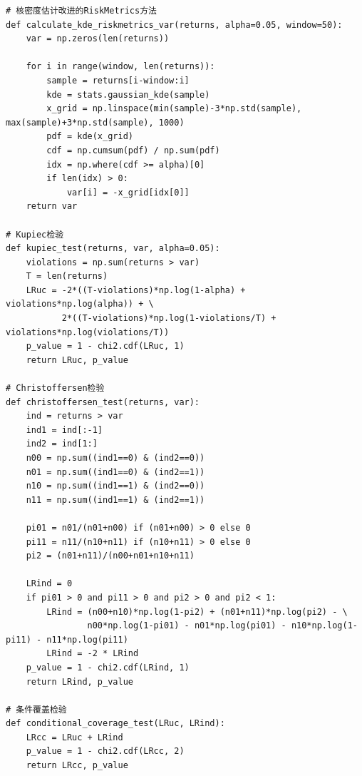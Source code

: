 \documentclass[12pt, a4paper]{article}
\begin{document}
\begin{lstlisting}[basicstyle=\small\ttfamily, breaklines=true, columns=fullflexible]
# 核密度估计改进的RiskMetrics方法
def calculate_kde_riskmetrics_var(returns, alpha=0.05, window=50):
    var = np.zeros(len(returns))
    
    for i in range(window, len(returns)):
        sample = returns[i-window:i]
        kde = stats.gaussian_kde(sample)
        x_grid = np.linspace(min(sample)-3*np.std(sample), max(sample)+3*np.std(sample), 1000)
        pdf = kde(x_grid)
        cdf = np.cumsum(pdf) / np.sum(pdf)
        idx = np.where(cdf >= alpha)[0]
        if len(idx) > 0:
            var[i] = -x_grid[idx[0]]
    return var

# Kupiec检验
def kupiec_test(returns, var, alpha=0.05):
    violations = np.sum(returns > var)
    T = len(returns)
    LRuc = -2*((T-violations)*np.log(1-alpha) + violations*np.log(alpha)) + \
           2*((T-violations)*np.log(1-violations/T) + violations*np.log(violations/T))
    p_value = 1 - chi2.cdf(LRuc, 1)
    return LRuc, p_value

# Christoffersen检验
def christoffersen_test(returns, var):
    ind = returns > var
    ind1 = ind[:-1]
    ind2 = ind[1:]
    n00 = np.sum((ind1==0) & (ind2==0))
    n01 = np.sum((ind1==0) & (ind2==1))
    n10 = np.sum((ind1==1) & (ind2==0))
    n11 = np.sum((ind1==1) & (ind2==1))
    
    pi01 = n01/(n01+n00) if (n01+n00) > 0 else 0
    pi11 = n11/(n10+n11) if (n10+n11) > 0 else 0
    pi2 = (n01+n11)/(n00+n01+n10+n11)
    
    LRind = 0
    if pi01 > 0 and pi11 > 0 and pi2 > 0 and pi2 < 1:
        LRind = (n00+n10)*np.log(1-pi2) + (n01+n11)*np.log(pi2) - \
                n00*np.log(1-pi01) - n01*np.log(pi01) - n10*np.log(1-pi11) - n11*np.log(pi11)
        LRind = -2 * LRind
    p_value = 1 - chi2.cdf(LRind, 1)
    return LRind, p_value

# 条件覆盖检验
def conditional_coverage_test(LRuc, LRind):
    LRcc = LRuc + LRind
    p_value = 1 - chi2.cdf(LRcc, 2)
    return LRcc, p_value
\end{lstlisting}
\end{document}
